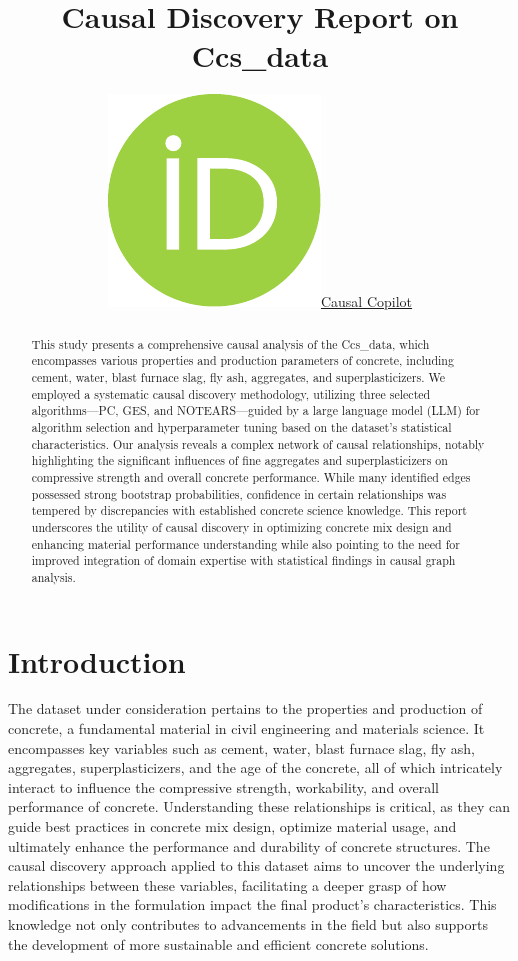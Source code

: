 \documentclass{article}
\title{Causal Discovery Report on Ccs\_data}
\author{ \href{https://orcid.org/0000-0000-0000-0000}{\includegraphics[scale=0.06]{postprocess/context/orcid.pdf}\hspace{1mm}Causal Copilot}}
\begin{document}
\maketitle

\begin{abstract}
This study presents a comprehensive causal analysis of the Ccs\_data, which encompasses various properties and production parameters of concrete, including cement, water, blast furnace slag, fly ash, aggregates, and superplasticizers. We employed a systematic causal discovery methodology, utilizing three selected algorithms—PC, GES, and NOTEARS—guided by a large language model (LLM) for algorithm selection and hyperparameter tuning based on the dataset's statistical characteristics. Our analysis reveals a complex network of causal relationships, notably highlighting the significant influences of fine aggregates and superplasticizers on compressive strength and overall concrete performance. While many identified edges possessed strong bootstrap probabilities, confidence in certain relationships was tempered by discrepancies with established concrete science knowledge. This report underscores the utility of causal discovery in optimizing concrete mix design and enhancing material performance understanding while also pointing to the need for improved integration of domain expertise with statistical findings in causal graph analysis.
\end{abstract}


\raggedbottom
\section{Introduction}
The dataset under consideration pertains to the properties and production of concrete, a fundamental material in civil engineering and materials science. It encompasses key variables such as cement, water, blast furnace slag, fly ash, aggregates, superplasticizers, and the age of the concrete, all of which intricately interact to influence the compressive strength, workability, and overall performance of concrete. Understanding these relationships is critical, as they can guide best practices in concrete mix design, optimize material usage, and ultimately enhance the performance and durability of concrete structures. The causal discovery approach applied to this dataset aims to uncover the underlying relationships between these variables, facilitating a deeper grasp of how modifications in the formulation impact the final product's characteristics. This knowledge not only contributes to advancements in the field but also supports the development of more sustainable and efficient concrete solutions.
\end{document}
